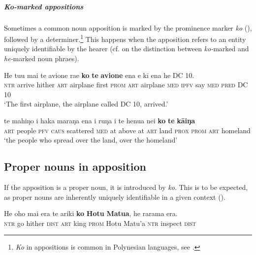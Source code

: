 \subparagraph{\textit{Ko}-marked appositions} Sometimes a common noun apposition is marked by the prominence marker \textit{ko} (), followed by a determiner.\footnote{\label{fn:277}\textit{Ko} in appositions is common in Polynesian languages, see \citet[45]{Clark1976}.} This happens when the apposition refers to an entity uniquely identifiable by the hearer (cf.  on the distinction between \textit{ko-}marked and \textit{he-}marked noun phraes).

\ea\label{ex:5.172}
\gll He tu{\ꞌ}u mai te {\ꞌ}avione ra{\ꞌ}e \textbf{ko} \textbf{te} \textbf{{\ꞌ}avione} ena e kī ena he DC 10. \\
\textsc{ntr} arrive hither \textsc{art} airplane first \textsc{prom} \textsc{art} airplane \textsc{med} \textsc{ipfv} say \textsc{med} \textsc{pred} DC 10 \\

\glt 
‘The first airplane, the airplane called DC 10, arrived.’ \textstyleExampleref{[R203.062]} 
\z

\ea\label{ex:5.173}
\gll te mahiŋo i haka maraŋa ena {\ꞌ}i ruŋa i te henua nei \textbf{ko} \textbf{te} \textbf{kāiŋa} \\
\textsc{art} people \textsc{pfv} \textsc{caus} scattered \textsc{med} at above at \textsc{art} land \textsc{prox} \textsc{prom} \textsc{art} homeland \\

\glt 
‘the people who spread over the land, over the homeland’ \textstyleExampleref{[R350.016]} 
\z

\subsection{Proper nouns in apposition}\label{sec:5.12.2}
If the apposition is a proper noun, it is introduced by \textit{ko}. This is to be expected, as proper nouns are inherently uniquely identifiable in a given context ().

\ea\label{ex:5.174}
\gll He oho mai era te {\ꞌ}ariki \textbf{ko} \textbf{Hotu} \textbf{Matu{\ꞌ}a}, he rarama era. \\
\textsc{ntr} go hither \textsc{dist} \textsc{art} king \textsc{prom} Hotu Matu’a \textsc{ntr} inspect \textsc{dist} \\

